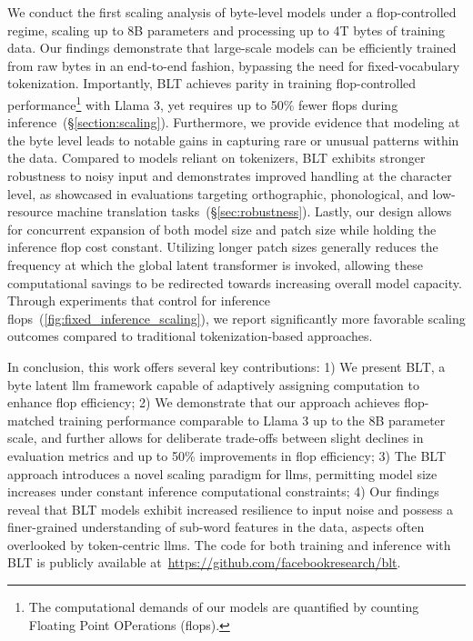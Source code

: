 We conduct the first scaling analysis of byte-level models under a flop-controlled regime, scaling up to 8B parameters and processing up to 4T bytes of training data. Our findings demonstrate that large-scale models can be efficiently trained from raw bytes in an end-to-end fashion, bypassing the need for fixed-vocabulary tokenization. Importantly, {\textsc BLT} achieves parity in training flop-controlled performance\footnote{The computational demands of our models are quantified by counting Floating Point OPerations (flops).} with Llama 3, yet requires up to 50\% fewer flops during inference~(\S\ref{section:scaling}).
Furthermore, we provide evidence that modeling at the byte level leads to notable gains in capturing rare or unusual patterns within the data. Compared to models reliant on tokenizers, {\textsc BLT} exhibits stronger robustness to noisy input and demonstrates improved handling at the character level, as showcased in evaluations targeting orthographic, phonological, and low-resource machine translation tasks~(\S\ref{sec:robustness}).
Lastly, our design allows for concurrent expansion of both model size and patch size while holding the inference flop cost constant. Utilizing longer patch sizes generally reduces the frequency at which the global latent transformer is invoked, allowing these computational savings to be redirected towards increasing overall model capacity. Through experiments that control for inference flops~(\autoref{fig:fixed_inference_scaling}), we report significantly more favorable scaling outcomes compared to traditional tokenization-based approaches.

In conclusion, this work offers several key contributions: 1) We present {\textsc BLT}, a byte latent llm framework capable of adaptively assigning computation to enhance flop efficiency; 2) We demonstrate that our approach achieves flop-matched training performance comparable to Llama 3 up to the 8B parameter scale, and further allows for deliberate trade-offs between slight declines in evaluation metrics and up to 50\% improvements in flop efficiency; 3) The {\textsc BLT} approach introduces a novel scaling paradigm for llms, permitting model size increases under constant inference computational constraints; 4) Our findings reveal that {\textsc BLT} models exhibit increased resilience to input noise and possess a finer-grained understanding of sub-word features in the data, aspects often overlooked by token-centric llms. The code for both training and inference with {\textsc BLT} is publicly available at~\url{https://github.com/facebookresearch/blt}.

